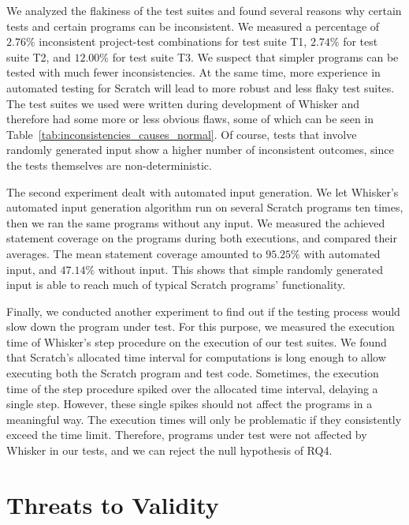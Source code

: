 We analyzed the flakiness of the test suites and found several reasons
why certain tests and certain programs can be inconsistent.
We measured a percentage of $2.76\%$ inconsistent project-test combinations for test suite T1, $2.74\%$ for test suite T2, and $12.00\%$ for test suite T3.
We suspect that simpler programs can be tested with much fewer inconsistencies.
At the same time, more experience in automated testing for Scratch will lead to more robust and less flaky test suites.
The test suites we used were written during development of Whisker and therefore had some more or less obvious flaws,
some of which can be seen in Table~\ref{tab:inconsistencies_causes_normal}.
Of course, tests that involve randomly generated input show a higher number of inconsistent outcomes,
since the tests themselves are non-deterministic.
\parspace

The second experiment dealt with automated input generation.
We let Whisker's automated input generation algorithm run on several Scratch programs ten times,
then we ran the same programs without any input.
We measured the achieved statement coverage on the programs during both executions,
and compared their averages.
The mean statement coverage amounted to $95.25\%$ with automated input, and $47.14\%$ without input.
This shows that simple randomly generated input is able to reach much of typical Scratch programs' functionality.
\parspace

Finally, we conducted another experiment to find out
if the testing process would slow down the program under test.
For this purpose, we measured the execution time of Whisker's step procedure on the execution of our test suites.
We found that Scratch's allocated time interval for computations is long enough to
allow executing both the Scratch program and test code.
Sometimes, the execution time of the step procedure spiked over the allocated time interval,
delaying a single step.
However, these single spikes should not affect the programs in a meaningful way.
The execution times will only be problematic if they consistently exceed the time limit.
Therefore, programs under test were not affected by Whisker in our tests, and we can reject the null hypothesis of RQ4.


\section{Threats to Validity}
\label{sec:threats_to_validity}

